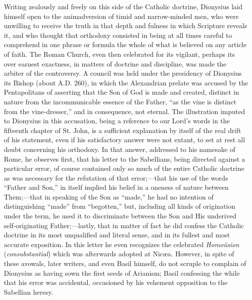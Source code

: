 Writing zealously and freely on this side of the Catholic doctrine,
Dionysius laid himself open to the animadversion of timid and
narrow-minded men, who were unwilling to receive the truth in that
depth and fulness in which Scripture reveals it, and who thought that
orthodoxy consisted in being at all times careful to comprehend in one
phrase or formula the whole of what is believed on any article of
faith. The Roman Church, even then celebrated for its vigilant,
perhaps its over earnest exactness, in matters of doctrine and
discipline, was made the arbiter of the controversy. A council was
held under the presidency of Dionysius its Bishop (about A.D.
260), in which the Alexandrian prelate was accused by the
Pentapolitans of asserting that the Son of God is made and created,
distinct in nature from the incommunicable essence of the Father,
``as the vine is distinct from the vine-dresser,'' and in
consequence, not eternal. The illustration imputed to Dionysius in
this accusation, being a reference to our Lord's words in the
fifteenth chapter of St. John, is a sufficient explanation by itself
of the real drift of his statement, even if his satisfactory answer
were not extant, to set at rest all doubt concerning his orthodoxy. In
that answer, addressed to his namesake of Rome, he observes first,
that his letter to the Sabellians, being directed against a particular
error, of course contained only so much of the entire Catholic
doctrine as was necessary for the refutation of that error;—that his
use of the words ``Father and Son,'' in itself implied his
belief in a oneness of nature between Them;—that in speaking of the
Son as ``made,'' he had no intention of distinguishing
``made'' from ``begotten,'' but, including all kinds
of origination under the term, he used it to discriminate between the
Son and His underived self-originating Father;—lastly, that in
matter of fact he did confess the Catholic doctrine in its most
unqualified and literal sense, and in its fullest and most accurate
exposition. In this letter he even recognizes the celebrated \emph{Homoüsion}
(\emph{consubstantial}) which was afterwards adopted at Nicæa.
However, in spite of these avowals, later writers, and even Basil
himself, do not scruple to complain of Dionysius as having sown the
first seeds of Arianism; Basil confessing the while that his error was
accidental, occasioned by his vehement opposition to the Sabellian
heresy.

